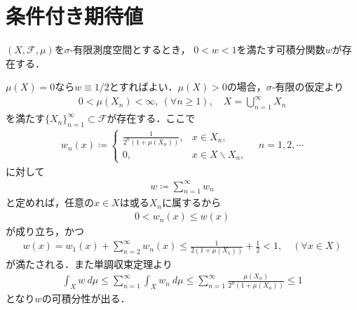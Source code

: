 \section{条件付き期待値}
	\begin{screen}
		\begin{lem}\label{lem:Lebesgue_Radon_Nikodym}
			$(X,\mathscr{F},\mu)$を$\sigma$-有限測度空間とするとき，
			$0 < w < 1$を満たす可積分関数$w$が存在する．
		\end{lem}
	\end{screen}
	
	\begin{prf}
		$\mu(X) = 0$なら$w \equiv 1/2$とすればよい．$\mu(X) > 0$の場合，$\sigma$-有限の仮定より
		\begin{align}
			0 < \mu(X_n) < \infty,\ (\forall n \geq 1),
			\quad X = \bigcup_{n=1}^\infty X_n
		\end{align}
		を満たす$\{X_n\}_{n=1}^\infty \subset \mathscr{F}$が存在する．ここで
		\begin{align}
			w_n(x) \coloneqq
			\begin{cases}
				\displaystyle\frac{1}{2^n\left(1+\mu(X_n)\right)}, & x \in X_n, \\
				0, & x \in X \backslash X_n,
			\end{cases}
			\quad n=1,2,\cdots
		\end{align}
		に対して
		\begin{align}
			w \coloneqq \sum_{n=1}^\infty w_n
		\end{align}
		と定めれば，任意の$x \in X$は或る$X_n$に属するから
		\begin{align}
			0 < w_n(x) \leq w(x)
		\end{align}
		が成り立ち，かつ
		\begin{align}
			w(x) = w_1(x) + \sum_{n=2}^\infty w_n(x)
			\leq \frac{1}{2\left(1+\mu(X_1)\right)} + \frac{1}{2}
			< 1,
			\quad (\forall x \in X)
		\end{align}
		が満たされる．また単調収束定理より
		\begin{align}
			\int_X w\ d\mu \leq \sum_{n=1}^\infty \int_X w_n\ d\mu
			\leq \sum_{n=1}^\infty \frac{\mu(X_n)}{2^n\left(1+\mu(X_n)\right)}
			\leq 1
		\end{align}
		となり$w$の可積分性が出る．
		\QED
	\end{prf}
	
